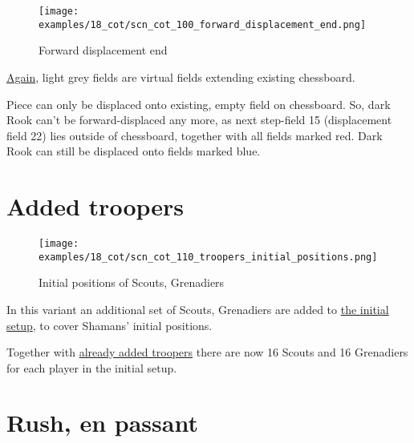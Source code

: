\noindent
\begin{figure}[!h]
\texttt{[image: examples/18\_cot/scn\_cot\_100\_forward\_displacement\_end.png]}
\caption{Forward displacement end}
\label{fig:scn_cot_100_forward_displacement_end}
\end{figure}

\hyperref[fig:scn_hd_06_centaur_off_board]{Again},
light grey fields are virtual fields extending existing chessboard.

Piece can only be displaced onto existing, empty field on chessboard. So, dark Rook
can't be forward-displaced any more, as next step-field 15 (displacement field 22)
lies outside of chessboard, together with all fields marked red. Dark Rook can still
be displaced onto fields marked blue.

\clearpage %

\section*{Added troopers}
\label{sec:Conquest of Tlalocan/Added troopers}

\vspace*{-1.2\baselineskip}
\noindent
\begin{figure}[!h]
\texttt{[image: examples/18\_cot/scn\_cot\_110\_troopers\_initial\_positions.png]}
\caption{Initial positions of Scouts, Grenadiers}
\label{fig:scn_cot_110_troopers_initial_positions}
\end{figure}

In this variant an additional set of Scouts, Grenadiers are added to
\hyperref[fig:18_conquest_of_tlalocan]{the initial setup},
to cover Shamans' initial positions.

Together with
\hyperref[fig:14_hemera_s_dawn]{already added troopers} there are now
16 Scouts and 16 Grenadiers for each player in the initial setup.

\clearpage %

\section*{Rush, en passant}
\label{sec:Conquest of Tlalocan/Rush, en passant}


